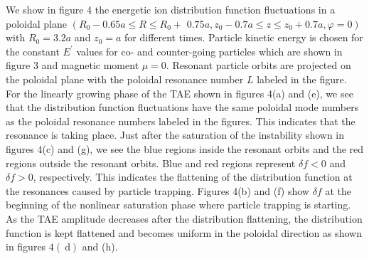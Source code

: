 \documentclass[10pt]{article}
\begin{document}
We show in figure 4 the energetic ion distribution function fluctuations in a poloidal plane $\left(R_{0}-0.65 a \leqslant R \leqslant R_{0}+\right.$ $\left.0.75 a, z_{0}-0.7 a \leqslant z \leqslant z_{0}+0.7 a, \varphi=0\right)$ with $R_{0}=3.2 a$ and $z_{0}=a$ for different times. Particle kinetic energy is chosen for the constant $E^{\prime}$ values for co- and counter-going particles which are shown in figure 3 and magnetic moment $\mu=0$. Resonant particle orbits are projected on the poloidal plane with the poloidal resonance number $L$ labeled in the figure. For the linearly growing phase of the TAE shown in figures 4(a) and (e), we see that the distribution function fluctuations have the same poloidal mode numbers as the poloidal resonance numbers labeled in the figures. This indicates that the resonance is taking place. Just after the saturation of the instability shown in figures 4(c) and (g), we see the blue regions inside the resonant orbits and the red regions outside the resonant orbits. Blue and red regions represent $\delta f<0$ and $\delta f>0$, respectively. This indicates the flattening of the distribution function at the resonances caused by particle trapping. Figures 4(b) and (f) show $\delta f$ at the beginning of the nonlinear saturation phase where particle trapping is starting. As the TAE amplitude decreases after the distribution flattening, the distribution function is kept flattened and becomes uniform in the poloidal direction as shown in figures $4(\mathrm{~d})$ and (h).
\end{document}
